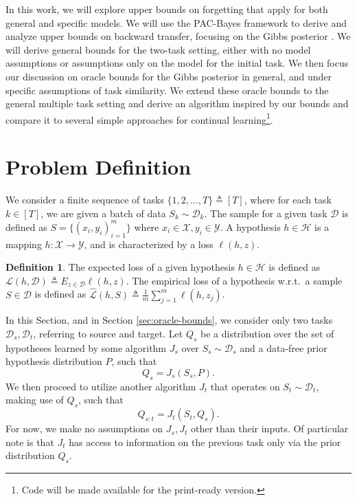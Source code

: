 \documentclass{article}
\theoremstyle{plain}
\theoremstyle{definition}
\newtheorem{definition}[theorem]{Definition}
\theoremstyle{remark}
\newcommand{\RM}[1]{{\textcolor{magenta}{#1}}}
\begin{document}
In this work, we will explore upper bounds on forgetting that apply for both general and specific models. We will use the PAC-Bayes \cite{Mcallester, Catoni2004, alquier2021user} %
framework to derive and analyze upper bounds on backward transfer, focusing on the Gibbs posterior \citep{casella1992explaining}. We will derive general bounds for the two-task setting, either with no model assumptions or assumptions only on the model for the initial task. We then focus our discussion on oracle bounds for the Gibbs posterior in general, and under specific assumptions of task similarity. We extend these oracle bounds to the general multiple task setting and derive an algorithm inspired by our bounds and compare it to several simple approaches for continual learning\footnote{Code will be made available for the print-ready version.}.

\section{Problem Definition}
%
We consider a finite sequence of tasks $\{1,2,\ldots,T\}\triangleq [T]$, where for each task $k\in[T]$, we are given a batch of data  $S_k\sim \mathcal{D}_k$. 
The sample for a given task $\mathcal{D}$ is defined as $S=\{(x_i,y_i)_{i=1}^m\}$ where $x_i\in \mathcal{X}, y_i\in \mathcal{Y}$.
 A hypothesis $h\in \mathcal{H}$ is a mapping $h:\mathcal{X}\rightarrow \mathcal{Y}$, and is characterized by a loss $\ell(h,z)$.

\begin{definition}
	The expected loss of a given hypothesis $h\in \mathcal{H}$ is defined as $\mathcal{L}(h, \mathcal{D}) \triangleq E_{z\in \mathcal{D}} \ell(h, z)$. The empirical loss of a hypothesis w.r.t.~a sample $S\in \mathcal{D}$ is defined as $\hat{\mathcal{L}}(h, S) \triangleq \frac{1}{m}\sum_{j=1}^{m}\ell(h, z_j)$.
\end{definition}

In this Section, and in Section \ref{sec:oracle-bounds}, we consider only two tasks $\mathcal{D}_s, \mathcal{D}_t$, referring to source and target. Let $Q_s$ be a distribution over the set of hypotheses learned by some algorithm $J_s$ over $S_s\sim \mathcal{D}_s$ and a data-free prior hypothesis distribution $P$, such that $$Q_s=J_s(S_s, P).$$ We then proceed to utilize another algorithm $J_t$ that operates on $S_t\sim \mathcal{D}_t$, making use of $Q_s$, such that 
$$Q_{s:t}=J_t(S_t, Q_s).$$ 
For now, we make no assumptions on $J_s,J_t$ other than their inputs. Of particular note is that $J_t$ has access to information on the previous task only via the prior distribution $Q_s$.
\end{document}
